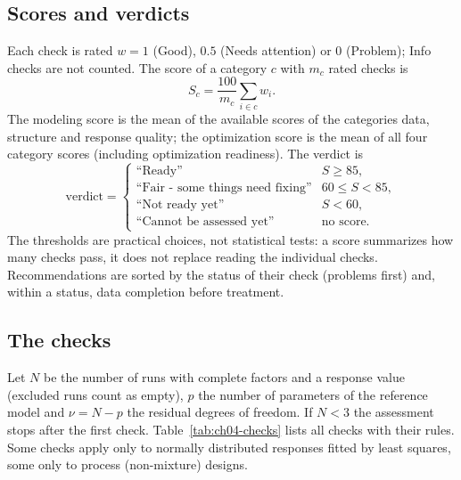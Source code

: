 \subsection{Scores and verdicts}
Each check is rated $w = 1$ (Good), $0.5$ (Needs attention) or $0$ (Problem); Info checks are not counted. The score
of a category $c$ with $m_c$ rated checks is
\begin{equation}
S_c = \frac{100}{m_c} \sum_{i \in c} w_i .
\label{eq:ch04-score}
\end{equation}
The modeling score is the mean of the available scores of the categories data, structure and response quality; the
optimization score is the mean of all four category scores (including optimization readiness). The verdict is
\begin{equation}
\text{verdict} = \begin{cases}
\text{``Ready''} & S \ge 85,\\
\text{``Fair - some things need fixing''} & 60 \le S < 85,\\
\text{``Not ready yet''} & S < 60,\\
\text{``Cannot be assessed yet''} & \text{no score.}
\end{cases}
\label{eq:ch04-verdict}
\end{equation}
The thresholds are practical choices, not statistical tests: a score summarizes how many checks pass, it does not
replace reading the individual checks. Recommendations are sorted by the status of their check (problems first)
and, within a status, data completion before treatment.

\subsection{The checks}
Let $N$ be the number of runs with complete factors and a response value (excluded runs count as empty), $p$ the
number of parameters of the reference model and $\nu = N - p$ the residual degrees of freedom. If $N < 3$ the
assessment stops after the first check. Table~\ref{tab:ch04-checks} lists all checks with their rules. Some checks
apply only to normally distributed responses fitted by least squares, some only to process (non-mixture) designs.

